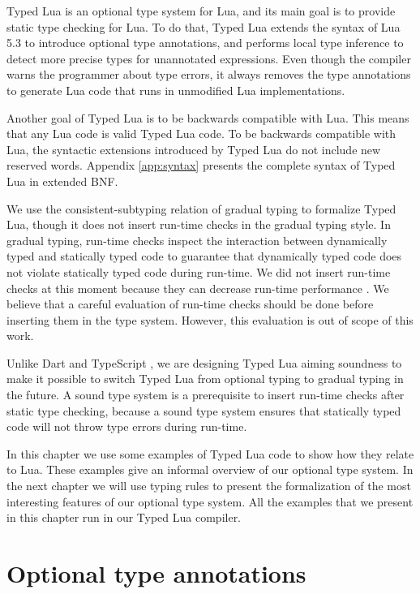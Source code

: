 Typed Lua is an optional type system for Lua, and its main goal is to
provide static type checking for Lua.
To do that, Typed Lua extends the syntax of Lua 5.3 to introduce
optional type annotations, and performs local type inference \cite{pierce2000lti}
to detect more precise types for unannotated expressions.
Even though the compiler warns the programmer about type errors,
it always removes the type annotations to generate Lua code that
runs in unmodified Lua implementations.

Another goal of Typed Lua is to be backwards compatible with Lua.
This means that any Lua code is valid Typed Lua code.
To be backwards compatible with Lua, the syntactic extensions introduced
by Typed Lua do not include new reserved words.
Appendix \ref{app:syntax} presents the complete syntax of Typed Lua
in extended BNF.

We use the consistent-subtyping relation of gradual typing
\cite{siek2007objects,siek2013mutable} to formalize Typed Lua,
though it does not insert run-time checks in the gradual typing style.
In gradual typing, run-time checks inspect the interaction between
dynamically typed and statically typed code to guarantee that dynamically
typed code does not violate statically typed code during run-time.
We did not insert run-time checks at this moment because they can decrease
run-time performance \cite{allende2013cis}.
We believe that a careful evaluation of run-time checks should be done before
inserting them in the type system.
However, this evaluation is out of scope of this work.

Unlike Dart \cite{dart} and TypeScript \cite{typescript},
we are designing Typed Lua aiming soundness to make it possible to
switch Typed Lua from optional typing to gradual typing in the future.
A sound type system is a prerequisite to insert run-time checks after
static type checking, because a sound type system ensures that
statically typed code will not throw type errors during run-time.

In this chapter we use some examples of Typed Lua code to show how
they relate to Lua.
These examples give an informal overview of our optional type system.
In the next chapter we will use typing rules to present the formalization
of the most interesting features of our optional type system.
All the examples that we present in this chapter run in our Typed Lua compiler.

\section{Optional type annotations}
\label{sec:annotations}

